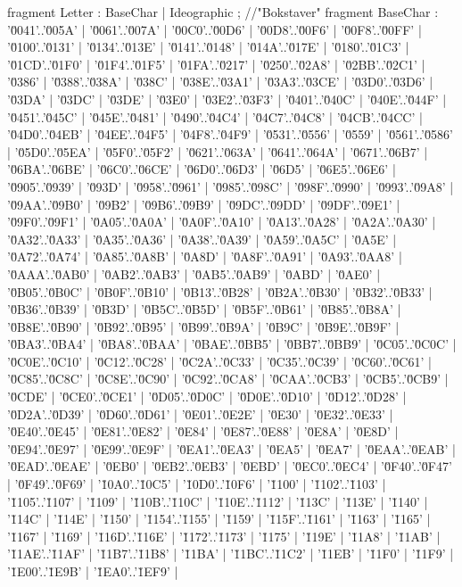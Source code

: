 fragment Letter              : BaseChar | Ideographic ;
//"Bokstaver"
fragment BaseChar                  : '\u0041'..'\u005A' | '\u0061'..'\u007A' | '\u00C0'..'\u00D6' | '\u00D8'..'\u00F6' | '\u00F8'..'\u00FF' | '\u0100'..'\u0131' | '\u0134'..'\u013E' | '\u0141'..'\u0148' | '\u014A'..'\u017E' | '\u0180'..'\u01C3' | '\u01CD'..'\u01F0' | '\u01F4'..'\u01F5' | '\u01FA'..'\u0217' | '\u0250'..'\u02A8' | '\u02BB'..'\u02C1' | '\u0386' | '\u0388'..'\u038A' | '\u038C' | '\u038E'..'\u03A1' | '\u03A3'..'\u03CE' | '\u03D0'..'\u03D6' | '\u03DA' | '\u03DC' | '\u03DE' | '\u03E0' | '\u03E2'..'\u03F3' | '\u0401'..'\u040C' | '\u040E'..'\u044F' | '\u0451'..'\u045C' | '\u045E'..'\u0481' | '\u0490'..'\u04C4' | '\u04C7'..'\u04C8' | '\u04CB'..'\u04CC' | '\u04D0'..'\u04EB' | '\u04EE'..'\u04F5' | '\u04F8'..'\u04F9' | '\u0531'..'\u0556' | '\u0559' | '\u0561'..'\u0586' | '\u05D0'..'\u05EA' | '\u05F0'..'\u05F2' | '\u0621'..'\u063A' | '\u0641'..'\u064A' | '\u0671'..'\u06B7' | '\u06BA'..'\u06BE' | '\u06C0'..'\u06CE' | '\u06D0'..'\u06D3' | '\u06D5' | '\u06E5'..'\u06E6' | '\u0905'..'\u0939' | '\u093D' | '\u0958'..'\u0961' | '\u0985'..'\u098C' | '\u098F'..'\u0990' | '\u0993'..'\u09A8' | '\u09AA'..'\u09B0' | '\u09B2' | '\u09B6'..'\u09B9' | '\u09DC'..'\u09DD' | '\u09DF'..'\u09E1' | '\u09F0'..'\u09F1' | '\u0A05'..'\u0A0A' | '\u0A0F'..'\u0A10' | '\u0A13'..'\u0A28' | '\u0A2A'..'\u0A30' | '\u0A32'..'\u0A33' | '\u0A35'..'\u0A36' | '\u0A38'..'\u0A39' | '\u0A59'..'\u0A5C' | '\u0A5E' | '\u0A72'..'\u0A74' | '\u0A85'..'\u0A8B' | '\u0A8D' | '\u0A8F'..'\u0A91' | '\u0A93'..'\u0AA8' | '\u0AAA'..'\u0AB0' | '\u0AB2'..'\u0AB3' | '\u0AB5'..'\u0AB9' | '\u0ABD' | '\u0AE0' | '\u0B05'..'\u0B0C' | '\u0B0F'..'\u0B10' | '\u0B13'..'\u0B28' | '\u0B2A'..'\u0B30' | '\u0B32'..'\u0B33' | '\u0B36'..'\u0B39' | '\u0B3D' | '\u0B5C'..'\u0B5D' | '\u0B5F'..'\u0B61' | '\u0B85'..'\u0B8A' | '\u0B8E'..'\u0B90' | '\u0B92'..'\u0B95' | '\u0B99'..'\u0B9A' | '\u0B9C' | '\u0B9E'..'\u0B9F' | '\u0BA3'..'\u0BA4' | '\u0BA8'..'\u0BAA' | '\u0BAE'..'\u0BB5' | '\u0BB7'..'\u0BB9' | '\u0C05'..'\u0C0C' | '\u0C0E'..'\u0C10' | '\u0C12'..'\u0C28' | '\u0C2A'..'\u0C33' | '\u0C35'..'\u0C39' | '\u0C60'..'\u0C61' | '\u0C85'..'\u0C8C' | '\u0C8E'..'\u0C90' | '\u0C92'..'\u0CA8' | '\u0CAA'..'\u0CB3' | '\u0CB5'..'\u0CB9' | '\u0CDE' | '\u0CE0'..'\u0CE1' | '\u0D05'..'\u0D0C' | '\u0D0E'..'\u0D10' | '\u0D12'..'\u0D28' | '\u0D2A'..'\u0D39' | '\u0D60'..'\u0D61' | '\u0E01'..'\u0E2E' | '\u0E30' | '\u0E32'..'\u0E33' | '\u0E40'..'\u0E45' | '\u0E81'..'\u0E82' | '\u0E84' | '\u0E87'..'\u0E88' | '\u0E8A' | '\u0E8D' | '\u0E94'..'\u0E97' | '\u0E99'..'\u0E9F' | '\u0EA1'..'\u0EA3' | '\u0EA5' | '\u0EA7' | '\u0EAA'..'\u0EAB' | '\u0EAD'..'\u0EAE' | '\u0EB0' | '\u0EB2'..'\u0EB3' | '\u0EBD' | '\u0EC0'..'\u0EC4' | '\u0F40'..'\u0F47' | '\u0F49'..'\u0F69' | '\u10A0'..'\u10C5' | '\u10D0'..'\u10F6' | '\u1100' | '\u1102'..'\u1103' | '\u1105'..'\u1107' | '\u1109' | '\u110B'..'\u110C' | '\u110E'..'\u1112' | '\u113C' | '\u113E' | '\u1140' | '\u114C' | '\u114E' | '\u1150' | '\u1154'..'\u1155' | '\u1159' | '\u115F'..'\u1161' | '\u1163' | '\u1165' | '\u1167' | '\u1169' | '\u116D'..'\u116E' | '\u1172'..'\u1173' | '\u1175' | '\u119E' | '\u11A8' | '\u11AB' | '\u11AE'..'\u11AF' | '\u11B7'..'\u11B8' | '\u11BA' | '\u11BC'..'\u11C2' | '\u11EB' | '\u11F0' | '\u11F9' | '\u1E00'..'\u1E9B' | '\u1EA0'..'\u1EF9' | 